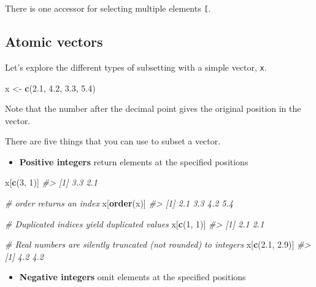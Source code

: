 \documentclass[]{book}
\newenvironment{Shaded}{\begin{snugshade}}{\end{snugshade}}
\newcommand{\KeywordTok}[1]{\textcolor[rgb]{0.13,0.29,0.53}{\textbf{#1}}}
\newcommand{\DecValTok}[1]{\textcolor[rgb]{0.00,0.00,0.81}{#1}}
\newcommand{\FloatTok}[1]{\textcolor[rgb]{0.00,0.00,0.81}{#1}}
\newcommand{\StringTok}[1]{\textcolor[rgb]{0.31,0.60,0.02}{#1}}
\newcommand{\CommentTok}[1]{\textcolor[rgb]{0.56,0.35,0.01}{\textit{#1}}}
\newcommand{\NormalTok}[1]{#1}
\providecommand{\tightlist}{%
  \setlength{\itemsep}{0pt}\setlength{\parskip}{0pt}}
\theoremstyle{definition}
\theoremstyle{definition}
\theoremstyle{definition}
\theoremstyle{remark}
\begin{document}
There is one accessor for selecting multiple elements \texttt{{[}}.

\subsection{Atomic vectors}\label{atomic-vectors-1}

Let's explore the different types of subsetting with a simple vector,
\texttt{x}.

\begin{Shaded}
\begin{Highlighting}[]
\NormalTok{x <-}\StringTok{ }\KeywordTok{c}\NormalTok{(}\FloatTok{2.1}\NormalTok{, }\FloatTok{4.2}\NormalTok{, }\FloatTok{3.3}\NormalTok{, }\FloatTok{5.4}\NormalTok{)}
\end{Highlighting}
\end{Shaded}

Note that the number after the decimal point gives the original position
in the vector.

There are five things that you can use to subset a vector.

\begin{itemize}
\tightlist
\item
  \textbf{Positive integers} return elements at the specified positions
\end{itemize}

\begin{Shaded}
\begin{Highlighting}[]
\NormalTok{x[}\KeywordTok{c}\NormalTok{(}\DecValTok{3}\NormalTok{, }\DecValTok{1}\NormalTok{)]}
\CommentTok{#> [1] 3.3 2.1}

\CommentTok{# order returns an index}
\NormalTok{x[}\KeywordTok{order}\NormalTok{(x)]}
\CommentTok{#> [1] 2.1 3.3 4.2 5.4}

\CommentTok{# Duplicated indices yield duplicated values}
\NormalTok{x[}\KeywordTok{c}\NormalTok{(}\DecValTok{1}\NormalTok{, }\DecValTok{1}\NormalTok{)]}
\CommentTok{#> [1] 2.1 2.1}

\CommentTok{# Real numbers are silently truncated (not rounded) to integers}
\NormalTok{x[}\KeywordTok{c}\NormalTok{(}\FloatTok{2.1}\NormalTok{, }\FloatTok{2.9}\NormalTok{)]}
\CommentTok{#> [1] 4.2 4.2}
\end{Highlighting}
\end{Shaded}

\begin{itemize}
\tightlist
\item
  \textbf{Negative integers} omit elements at the specified positions
\end{itemize}
\end{document}
